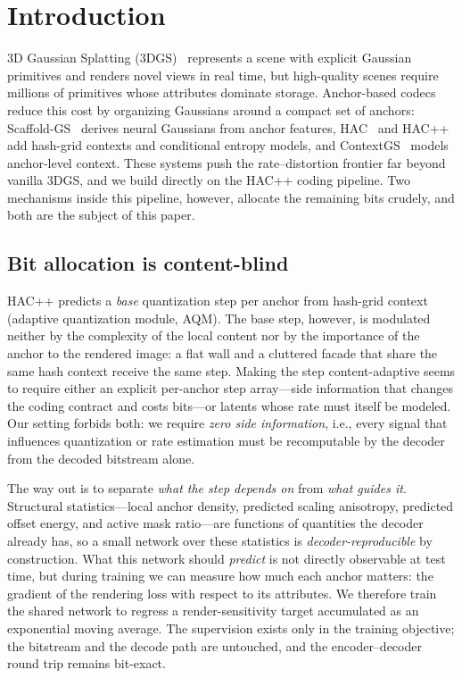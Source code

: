 \documentclass[conference]{IEEEtran}
\begin{document}
\section{Introduction}

3D Gaussian Splatting (3DGS)~\cite{kerbl2023} represents a scene with explicit
Gaussian primitives and renders novel views in real time, but high-quality scenes
require millions of primitives whose attributes dominate storage. Anchor-based
codecs reduce this cost by organizing Gaussians around a compact set of anchors:
Scaffold-GS~\cite{lu2024} derives neural Gaussians from anchor features,
HAC~\cite{chen2024} and HAC++~\cite{chen2025} add hash-grid contexts and
conditional entropy models, and ContextGS~\cite{wang2024b} models anchor-level
context. These systems push the rate--distortion frontier far beyond vanilla 3DGS,
and we build directly on the HAC++ coding pipeline. Two mechanisms inside this
pipeline, however, allocate the remaining bits crudely, and both are the subject of
this paper.

\subsection{Bit allocation is content-blind}

HAC++ predicts a \emph{base} quantization step per anchor from hash-grid context
(adaptive quantization module, AQM). The base step, however, is modulated neither
by the complexity of the local content nor by the importance of the anchor to the
rendered image: a flat wall and a cluttered facade that share the same hash context
receive the same step. Making the step content-adaptive seems to require either an
explicit per-anchor step array---side information that changes the coding contract
and costs bits---or latents whose rate must itself be modeled. Our setting forbids
both: we require \emph{zero side information}, i.e., every signal that influences
quantization or rate estimation must be recomputable by the decoder from the decoded
bitstream alone.

The way out is to separate \emph{what the step depends on} from \emph{what guides
it}. Structural statistics---local anchor density, predicted scaling anisotropy,
predicted offset energy, and active mask ratio---are functions of quantities the
decoder already has, so a small network over these statistics is
\emph{decoder-reproducible} by construction. What this network should \emph{predict}
is not directly observable at test time, but during training we can measure how much
each anchor matters: the gradient of the rendering loss with respect to its
attributes. We therefore train the shared network to regress a render-sensitivity
target accumulated as an exponential moving average. The supervision exists only in
the training objective; the bitstream and the decode path are untouched, and the
encoder--decoder round trip remains bit-exact.
\end{document}
